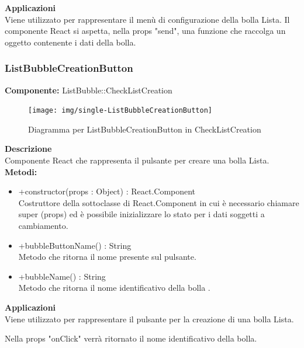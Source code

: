 \textbf{Applicazioni}\\
Viene utilizzato per rappresentare il menù di configurazione della bolla Lista. Il componente React si aspetta, nella props "send", una funzione che raccolga un oggetto contenente i dati della bolla. 


\clearpage

\subsubsection{ListBubbleCreationButton}
\textbf{Componente:}  ListBubble::CheckListCreation\\
   \FloatBarrier
   \begin{figure}[ht]
   \centering
   \texttt{[image: img/single-ListBubbleCreationButton]}
   \caption{{Diagramma per ListBubbleCreationButton in CheckListCreation}}
\end{figure}
\FloatBarrier
\textbf{Descrizione}\\
Componente React che rappresenta il pulsante per creare una bolla Lista.
\\
\textbf{Metodi:} 
\begin{itemize}
\item +constructor(props : Object) : React.Component 
\\
Costruttore della sottoclasse di React.Component in cui è necessario chiamare super (props) ed è possibile inizializzare lo stato per i dati soggetti a cambiamento.

\item +bubbleButtonName() : String 
\\
Metodo che ritorna il nome presente sul pulsante.

\item +bubbleName() : String 
\\
Metodo che ritorna il nome identificativo della bolla .

\end{itemize} 


\textbf{Applicazioni}\\
Viene utilizzato per rappresentare il pulsante per la creazione di una bolla Lista.

Nella props "onClick" verrà ritornato il nome identificativo della bolla. 


\clearpage

